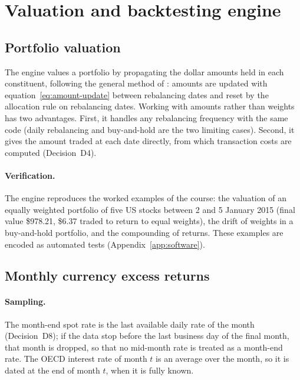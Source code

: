 \section{Valuation and backtesting engine}\label{sec:engine}

\subsection{Portfolio valuation}\label{sec:valuation}

The engine values a portfolio by propagating the dollar amounts held in each constituent, following the general method of \citet{milhau2026}: amounts are updated with equation~\eqref{eq:amount-update} between rebalancing dates and reset by the allocation rule on rebalancing dates.
Working with amounts rather than weights has two advantages.
First, it handles any rebalancing frequency with the same code (daily rebalancing and buy-and-hold are the two limiting cases).
Second, it gives the amount traded at each date directly, from which transaction costs are computed (Decision~D4).

\paragraph{Verification.}
The engine reproduces the worked examples of the course: the valuation of an equally weighted portfolio of five US stocks between 2 and 5 January 2015 (final value \$978.21, \$6.37 traded to return to equal weights), the drift of weights in a buy-and-hold portfolio, and the compounding of returns.
These examples are encoded as automated tests (Appendix~\ref{app:software}).

\subsection{Monthly currency excess returns}\label{sec:rx}

\paragraph{Sampling.}
The month-end spot rate is the last available daily rate of the month (Decision~D8); if the data stop before the last business day of the final month, that month is dropped, so that no mid-month rate is treated as a month-end rate.
The OECD interest rate of month $t$ is an average over the month, so it is dated at the end of month $t$, when it is fully known.

